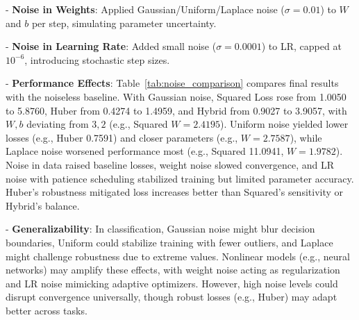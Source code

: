 \documentclass{article}
\begin{document}
- \textbf{Noise in Weights}: Applied Gaussian/Uniform/Laplace noise (\( \sigma = 0.01 \)) to \( W \) and \( b \) per step, simulating parameter uncertainty.

- \textbf{Noise in Learning Rate}: Added small noise (\( \sigma = 0.0001 \)) to LR, capped at \( 10^{-6} \), introducing stochastic step sizes.

- \textbf{Performance Effects}: Table~\ref{tab:noise_comparison} compares final results with the noiseless baseline. With Gaussian noise, Squared Loss rose from 1.0050 to 5.8760, Huber from 0.4274 to 1.4959, and Hybrid from 0.9027 to 3.9057, with \( W, b \) deviating from \( 3, 2 \) (e.g., Squared \( W = 2.4195 \)). Uniform noise yielded lower losses (e.g., Huber 0.7591) and closer parameters (e.g., \( W = 2.7587 \)), while Laplace noise worsened performance most (e.g., Squared 11.0941, \( W = 1.9782 \)). Noise in data raised baseline losses, weight noise slowed convergence, and LR noise with patience scheduling stabilized training but limited parameter accuracy. Huber’s robustness mitigated loss increases better than Squared’s sensitivity or Hybrid’s balance.

- \textbf{Generalizability}: In classification, Gaussian noise might blur decision boundaries, Uniform could stabilize training with fewer outliers, and Laplace might challenge robustness due to extreme values. Nonlinear models (e.g., neural networks) may amplify these effects, with weight noise acting as regularization and LR noise mimicking adaptive optimizers. However, high noise levels could disrupt convergence universally, though robust losses (e.g., Huber) may adapt better across tasks.
\end{document}
